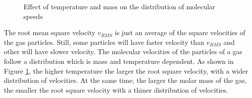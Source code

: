 \documentclass[main.tex]{subfiles}
\begin{document}
\begin{description}
\begin{figure}
\begin{center}
\end{center}
\caption{Effect of temperature and mass on the distribution of molecular speeds}
\label{fig:{\chapterlabel}9}
\end{figure}
\item[\docfilehook{Distribution of velocities}{}] 
The root mean square velocity $v_{RMS}$ is just an average of the square velocities of the gas particles. Still, some particles will have faster velocity than $v_{RMS}$ and other will have slower velocity. The molecular velocities of the particles of a gas follow a distribution which is mass and temperature dependent. 
As shown in Figure \ref{fig:{\chapterlabel}9}, the higher temperature the larger the root square velocity, with a wider distribution of velocities. At the same time, the larger the molar mass of the gas, the smaller the root square velocity with a thiner distribution of velocities.



\end{description}

\clearpage\thispagestyle{empty}\mbox{}\clearpage
\end{document}
